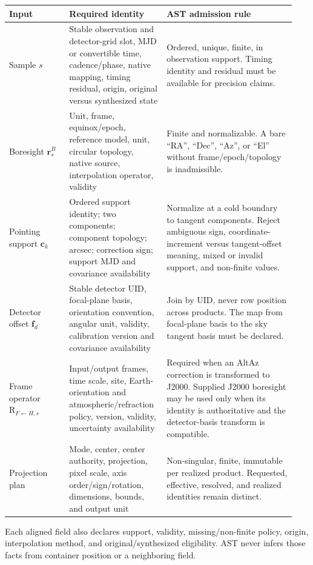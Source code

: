 \documentclass[11pt]{article}
\renewcommand{\mathsf}[1]{\mathrm{#1}}
\begin{document}
\begin{longtable}{>{\raggedright\arraybackslash}p{0.20\linewidth}
                  >{\raggedright\arraybackslash}p{0.31\linewidth}
                  >{\raggedright\arraybackslash}p{0.43\linewidth}}
\toprule
Input & Required identity & AST admission rule \\
\midrule
\endhead
Sample $s$ & Stable observation and detector-grid slot, MJD or convertible
time, cadence/phase, native mapping, timing residual, origin, original versus
synthesized state & Ordered, unique, finite, in observation support.  Timing
identity and residual must be available for precision claims. \\
Boresight $\boldsymbol r^B_s$ & Unit, frame, equinox/epoch, reference model,
unit, circular topology, native source, interpolation operator, validity &
Finite and normalizable.  A bare ``RA'', ``Dec'', ``Az'', or ``El'' without
frame/epoch/topology is inadmissible. \\
Pointing support $\boldsymbol c_k$ & Ordered support identity; two components;
component topology; arcsec; correction sign; support MJD and covariance
availability & Normalize at a cold boundary to tangent components.  Reject
ambiguous sign, coordinate-increment versus tangent-offset meaning, mixed or
invalid support, and non-finite values. \\
Detector offset $\boldsymbol f_d$ & Stable detector UID, focal-plane basis,
orientation convention, angular unit, validity, calibration version and
covariance availability & Join by UID, never row position across products.
The map from focal-plane basis to the sky tangent basis must be declared. \\
Frame operator $\mathsf R_{F\leftarrow H,s}$ & Input/output frames, time scale,
site, Earth-orientation and atmospheric/refraction policy, version, validity,
uncertainty availability & Required when an AltAz correction is transformed
to J2000.  Supplied J2000 boresight may be used only when its identity is
authoritative and the detector-basis transform is compatible. \\
Projection plan & Mode, center, center authority, projection, pixel scale,
axis order/sign/rotation, dimensions, bounds, and output unit & Non-singular,
finite, immutable per realized product.  Requested, effective, resolved, and
realized identities remain distinct. \\
\bottomrule
\end{longtable}

Each aligned field also declares support, validity, missing/non-finite policy,
origin, interpolation method, and original/synthesized eligibility.  AST never
infers those facts from container position or a neighboring field.
\end{document}
